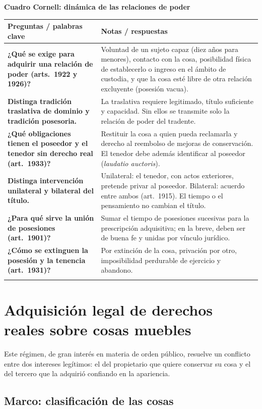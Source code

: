 \documentclass[12pt,oneside]{book}
\renewcommand{\arraystretch}{1.25}
\newcommand{\cq}[2]{\textbf{#1} & #2 \\[0.45em]}
\newcommand{\cornell}[3]{%
\par\bigskip\noindent\textbf{\large Cuadro Cornell: #1}\par\smallskip
\begin{center}
\small
\renewcommand{\arraystretch}{1.15}
\begin{tabularx}{\textwidth}{>{\raggedright\arraybackslash}p{0.27\textwidth}>{\raggedright\arraybackslash}X}
\toprule
\textbf{Preguntas / palabras clave} & \textbf{Notas / respuestas} \\
\midrule
#2
\midrule
\multicolumn{2}{p{\dimexpr\textwidth-2\tabcolsep\relax}}{\textbf{Resumen.} #3} \\
\bottomrule
\end{tabularx}
\end{center}
}
\begin{document}
\cornell{dinámica de las relaciones de poder}{
\cq{¿Qué se exige para adquirir una relación de poder (arts.~1922 y 1926)?}{Voluntad de un sujeto capaz (diez años para menores), contacto con la cosa, posibilidad física de establecerlo o ingreso en el ámbito de custodia, y que la cosa esté libre de otra relación excluyente (posesión vacua).}
\cq{Distinga tradición traslativa de dominio y tradición posesoria.}{La traslativa requiere legitimado, título suficiente y capacidad. Sin ellos se transmite solo la relación de poder del tradente.}
\cq{¿Qué obligaciones tienen el poseedor y el tenedor sin derecho real (art.~1933)?}{Restituir la cosa a quien pueda reclamarla y derecho al reembolso de mejoras de conservación. El tenedor debe además identificar al poseedor (\textit{laudatio auctoris}).}
\cq{Distinga intervención unilateral y bilateral del título.}{Unilateral: el tenedor, con actos exteriores, pretende privar al poseedor. Bilateral: acuerdo entre ambos (art.~1915). El tiempo o el pensamiento no cambian el título.}
\cq{¿Para qué sirve la unión de posesiones (art.~1901)?}{Sumar el tiempo de posesiones sucesivas para la prescripción adquisitiva; en la breve, deben ser de buena fe y unidas por vínculo jurídico.}
\cq{¿Cómo se extinguen la posesión y la tenencia (art.~1931)?}{Por extinción de la cosa, privación por otro, imposibilidad perdurable de ejercicio y abandono.}
}{La relación de poder se adquiere voluntariamente por un sujeto capaz mediante contacto o custodia, sobre una cosa libre de otra relación excluyente. Genera derechos inherentes y obligaciones de restitución, no cambia de causa por voluntad propia salvo intervención del título, puede sumarse a la de los antecesores y se extingue por pérdida de la cosa, privación, imposibilidad o abandono.}

\chapter[Adquisición legal sobre cosas muebles: art.~1895]{Adquisición legal de derechos reales sobre cosas muebles}\label{cap:muebles}

Este régimen, de gran interés en materia de orden público, resuelve un conflicto entre dos intereses legítimos: el del propietario que quiere conservar su cosa y el del tercero que la adquirió confiando en la apariencia.

\section{Marco: clasificación de las cosas}
\end{document}
